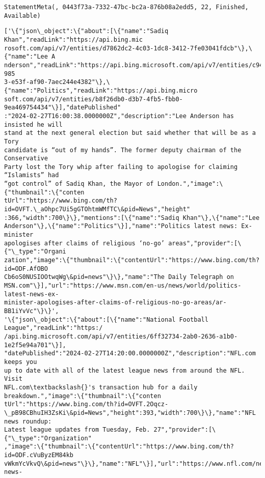 \documentclass[11pt]{article}
\begin{document}
    
    \begin{Verbatim}[commandchars=\\\{\}]
StatementMeta(, 0443f73a-7332-47bc-bc2a-876b08a2edd5, 22, Finished, Available)
    \end{Verbatim}

    
    \begin{Verbatim}[commandchars=\\\{\}]
['\{"json\_object":\{"about":[\{"name":"Sadiq Khan","readLink":"https://api.bing.mic
rosoft.com/api/v7/entities/d7862dc2-4c03-1dc8-3412-7fe03041fdcb"\},\{"name":"Lee A
nderson","readLink":"https://api.bing.microsoft.com/api/v7/entities/c94f2fa6-985
3-e53f-af90-7aec244e4382"\},\{"name":"Politics","readLink":"https://api.bing.micro
soft.com/api/v7/entities/b8f26db0-d3b7-4fb5-fbb0-9ea469754434"\}],"datePublished"
:"2024-02-27T16:00:38.0000000Z","description":"Lee Anderson has insisted he will
stand at the next general election but said whether that will be as a Tory
candidate is “out of my hands”. The former deputy chairman of the Conservative
Party lost the Tory whip after failing to apologise for claiming “Islamists” had
“got control” of Sadiq Khan, the Mayor of London.","image":\{"thumbnail":\{"conten
tUrl":"https://www.bing.com/th?id=OVFT.\_aOhpc7Ui5gGTOhtmWMfTC\&pid=News","height"
:366,"width":700\}\},"mentions":[\{"name":"Sadiq Khan"\},\{"name":"Lee
Anderson"\},\{"name":"Politics"\}],"name":"Politics latest news: Ex-minister
apologises after claims of religious ‘no-go’ areas","provider":[\{"\_type":"Organi
zation","image":\{"thumbnail":\{"contentUrl":"https://www.bing.com/th?id=ODF.AfOBO
Cb6oS0NUSIOOtwqWg\&pid=news"\}\},"name":"The Daily Telegraph on
MSN.com"\}],"url":"https://www.msn.com/en-us/news/world/politics-latest-news-ex-
minister-apologises-after-claims-of-religious-no-go-areas/ar-BB1iYvVc"\}\}',
'\{"json\_object":\{"about":[\{"name":"National Football League","readLink":"https:/
/api.bing.microsoft.com/api/v7/entities/6ff32734-2ab0-2636-a1b0-1e2f5e94a701"\}],
"datePublished":"2024-02-27T14:20:00.0000000Z","description":"NFL.com keeps you
up to date with all of the latest league news from around the NFL. Visit
NFL.com\textbackslash{}'s transaction hub for a daily breakdown.","image":\{"thumbnail":\{"conten
tUrl":"https://www.bing.com/th?id=OVFT.2Oqcz-
\_pB98CBhuIH3ZsKi\&pid=News","height":393,"width":700\}\},"name":"NFL news roundup:
Latest league updates from Tuesday, Feb. 27","provider":[\{"\_type":"Organization"
,"image":\{"thumbnail":\{"contentUrl":"https://www.bing.com/th?id=ODF.cVuByzEM84kb
vWkmYcVkvQ\&pid=news"\}\},"name":"NFL"\}],"url":"https://www.nfl.com/news/nfl-news-

\end{Verbatim}
\end{document}
